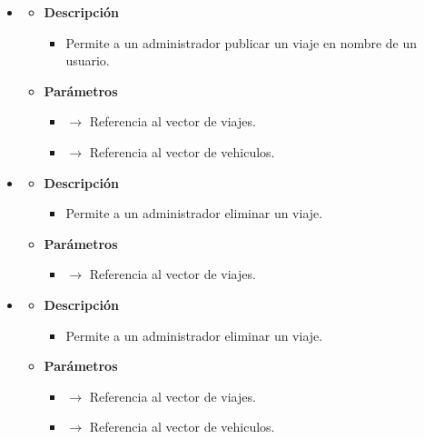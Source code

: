 \begin{itemize}
\begin{itemize}
\begin{itemize}
		\end{itemize}
	\end{itemize}
    \item {}
    \begin{itemize}
        \item \textbf{Descripción}
        \begin{itemize}
			\item Permite a un administrador publicar un viaje en nombre de un usuario.
		\end{itemize}
		\item \textbf{Parámetros}
		\begin{itemize}
			\item {}  $\rightarrow$ Referencia al vector de viajes.
            \item {} $\rightarrow$ Referencia al vector de vehiculos.
		\end{itemize}
	\end{itemize}
    \item {}
    \begin{itemize}
        \item \textbf{Descripción}
        \begin{itemize}
			\item  Permite a un administrador eliminar un viaje.
		\end{itemize}
		\item \textbf{Parámetros}
		\begin{itemize}
			\item {}  $\rightarrow$ Referencia al vector de viajes.
		\end{itemize}
	\end{itemize}
    \item {}
    \begin{itemize}
        \item \textbf{Descripción}
        \begin{itemize}
			\item Permite a un administrador eliminar un viaje.
		\end{itemize}
		\item \textbf{Parámetros}
		\begin{itemize}
			\item {}  $\rightarrow$ Referencia al vector de viajes.
            \item {} $\rightarrow$ Referencia al vector de vehiculos.

\end{itemize}
\end{itemize}
\end{itemize}
